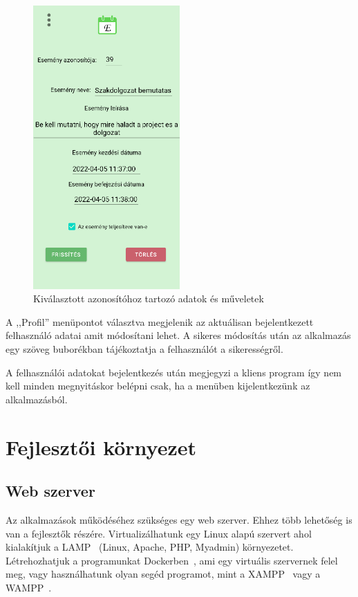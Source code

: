 \documentclass[
]{thesis-ekf}
\theoremstyle{definition}
\theoremstyle{remark}
\begin{document}
	\begin{figure}[ht!]
		\centering
		\includegraphics[width=0.5\textwidth]{android_app/android_specify_event}
		\caption{Kiválasztott azonosítóhoz tartozó adatok és műveletek}
		\label{figure:android_specify_event}
	\end{figure}
	
	A ,,Profil'' menüpontot választva megjelenik az aktuálisan bejelentkezett felhasználó adatai amit módosítani lehet. A sikeres módosítás után az alkalmazás egy szöveg buborékban tájékoztatja a felhasználót a sikerességről. 
	
	A felhasználói adatokat bejelentkezés után megjegyzi a kliens program így nem kell minden megnyitáskor belépni csak, ha a menüben kijelentkezünk az alkalmazásból. 
	
	\chapter{Fejlesztői környezet}
	\section{Web szerver}
	Az alkalmazások működéséhez szükséges egy web szerver. Ehhez több lehetőség is van a fejlesztők részére. Virtualizálhatunk egy Linux alapú szervert ahol kialakítjuk a LAMP~\cite{lamp_book} (Linux, Apache, PHP, Myadmin) környezetet. Létrehozhatjuk a programunkat Dockerben~\cite{docker_doc}, ami egy virtuális szervernek felel meg, vagy használhatunk olyan segéd programot, mint a XAMPP~\cite{xampp_doc} vagy a WAMPP~\cite{wamp_doc}. 
	
\end{document}
